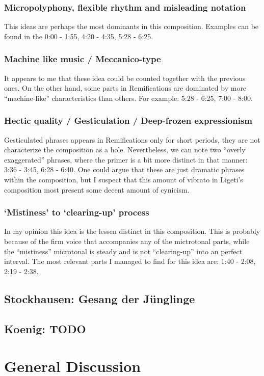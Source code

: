 \documentclass[a4paper,11pt]{article}
\begin{document}
\subsubsection{Micropolyphony, flexible rhythm and misleading notation}

This ideas are perhaps the most dominants in this composition.
Examples can be found in the 0:00 - 1:55, 4:20 - 4:35, 5:28 - 6:25.

\subsubsection{Machine like music / Meccanico-type}

It appears to me that these idea could be counted together with the previous ones.
On the other hand, some parts in Remifications are dominated by more ``machine-like'' characteristics than others.
For example: 5:28 - 6:25, 7:00 - 8:00.

\subsubsection{Hectic quality / Gesticulation / Deep-frozen expressionism}

Gesticulated phrases appears in Remifications only for short periods, they are not characterize the composition as a hole.
Nevertheless, we can note two ``overly exaggerated'' phrases, where the primer is a bit more distinct in that manner: 3:36 - 3:45, 6:28 - 6:40.
One could argue that these are just dramatic phrases within the composition, but I suspect that this amount of vibrato in Ligeti's composition most present some decent amount of cynicism.

\subsubsection{‘Mistiness’ to ‘clearing-up’ process}

In my opinion this idea is the lessen distinct in this composition.
This is probably because of the firm voice that accompanies any of the mictrotonal parts, while the ``mistiness'' microtonal is steady and is not ``clearing-up'' into an perfect interval.
The most relevant parts I managed to find for this idea are: 1:40 - 2:08, 2:19 - 2:38.

\subsection{Stockhausen: Gesang der J{\"u}nglinge}
\label{sub:composition_stockhausen}

\subsection{Koenig: TODO}
\label{sub:composition_koenig}

\section{General Discussion}
\label{sec:general_discussion}

\printbibliography[title={Bibliography}]
\end{document}
